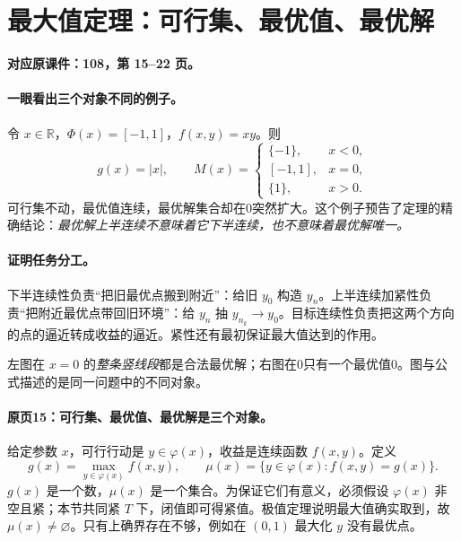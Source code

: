 \documentclass[11pt,a4paper]{article}
\newcommand{\R}{\mathbb{R}}\newcommand{\N}{\mathbb{N}}
\theoremstyle{definition}\newtheorem{definition}{定义}\newtheorem{example}{例}
\begin{document}
\clearpage\section{最大值定理：可行集、最优值、最优解}\label{g:108:15}

\textbf{对应原课件：108，第 15--22 页。}


\paragraph{一眼看出三个对象不同的例子。}
令 $x\in\R$，$\Phi(x)=[-1,1]$，$f(x,y)=xy$。则
\[g(x)=|x|,\qquad M(x)=
\begin{cases}\{-1\},&x<0,\\{[-1,1]},&x=0,\\\{1\},&x>0.\end{cases}\]
可行集不动，最优值连续，最优解集合却在0突然扩大。这个例子预告了定理的精确结论：\emph{最优解上半连续不意味着它下半连续，也不意味着最优解唯一。}
\paragraph{证明任务分工。}
下半连续性负责“把旧最优点搬到附近”：给旧 $y_0$ 构造 $y_n$。上半连续加紧性负责“把附近最优点带回旧环境”：给 $y_n$ 抽 $y_{n_k}\to y_0$。目标连续性负责把这两个方向的点的逼近转成收益的逼近。紧性还有最初保证最大值达到的作用。

\begin{center}
\end{center}
左图在 $x=0$ 的\emph{整条竖线段}都是合法最优解；右图在0只有一个最优值0。图与公式描述的是同一问题中的不同对象。


\paragraph{原页15：可行集、最优值、最优解是三个对象。}给定参数 $x$，可行行动是 $y\in\varphi(x)$，收益是连续函数 $f(x,y)$。定义
\[g(x)=\max_{y\in\varphi(x)}f(x,y),\qquad
\mu(x)=\{y\in\varphi(x):f(x,y)=g(x)\}.\]
$g(x)$ 是一个数，$\mu(x)$ 是一个集合。为保证它们有意义，必须假设 $\varphi(x)$ 非空且紧；本节共同紧 $T$ 下，闭值即可得紧值。极值定理说明最大值确实取到，故 $\mu(x)\ne\varnothing$。只有上确界存在不够，例如在 $(0,1)$ 最大化 $y$ 没有最优点。
\end{document}
